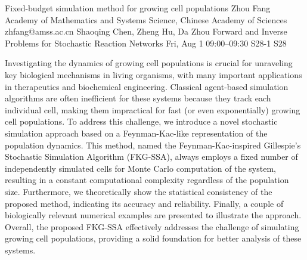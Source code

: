 \documentclass[12pt,lettersize,oneside]{book} %
\begin{document}
\begin{talk}
  {Fixed-budget simulation method for growing cell populations}%
  {Zhou Fang}%
  {Academy of Mathematics and Systems Science, Chinese Academy of Sciences}%
  {zhfang@amss.ac.cn}%
  {Shaoqing Chen, Zheng Hu, Da Zhou}%
  {Forward and Inverse Problems for Stochastic Reaction Networks}%
  {Fri, Aug 1 09:00--09:30}%
  {S28-1}%
  {S28}%
    
   
Investigating the dynamics of growing cell populations is crucial for unraveling key biological mechanisms in living organisms, with many important applications in therapeutics and biochemical engineering. Classical agent-based simulation algorithms are often inefficient for these systems because
they track each individual cell, making them impractical for fast (or even exponentially) growing
cell populations. To address this challenge, we introduce a novel stochastic simulation approach
based on a Feynman-Kac-like representation of the population dynamics. This method, named the
Feynman-Kac-inspired Gillespie’s Stochastic Simulation Algorithm (FKG-SSA), always employs a
fixed number of independently simulated cells for Monte Carlo computation of the system, resulting in a constant computational complexity regardless of the population size. Furthermore, we
theoretically show the statistical consistency of the proposed method, indicating its accuracy and
reliability. Finally, a couple of biologically relevant numerical examples are presented to illustrate the
approach. Overall, the proposed FKG-SSA effectively addresses the challenge of simulating growing
cell populations, providing a solid foundation for better analysis of these systems.


\end{talk}
\end{document}
